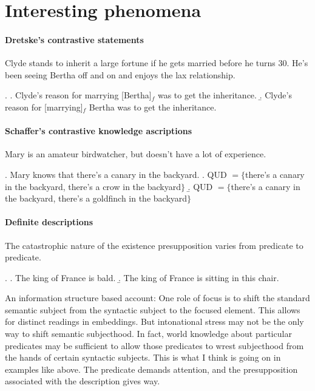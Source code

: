 \documentclass[letterpaper]{article}
\title{}
\author{}
\begin{document}


\section{Interesting phenomena}

\paragraph{Dretske's contrastive statements} Clyde stands to inherit a large fortune if he gets married before he turns 30. He's been seeing Bertha off and on and enjoys the lax relationship.

\ex. \a. Clyde's reason for marrying [Bertha]$_f$ was to get the inheritance.
\b. Clyde's reason for [marrying]$_f$ Bertha was to get the inheritance.

\paragraph{Schaffer's contrastive knowledge ascriptions} Mary is an amateur birdwatcher, but doesn't have a lot of experience.

\ex. Mary knows that there's a canary in the backyard.
\a. QUD $= \{$there's a canary in the backyard, there's a crow in the backyard$\}$
\b. QUD $= \{$there's a canary in the backyard, there's a goldfinch in the backyard$\}$

\paragraph{Definite descriptions} The catastrophic nature of the existence presupposition varies from predicate to predicate.

\ex. \a. The king of France is bald.
\b. The king of France is sitting in this chair.

An information structure based account: One role of focus is to shift the standard semantic subject from the syntactic subject to the focused element. This allows for distinct readings in embeddings.  But intonational stress may not be the only way to shift semantic subjecthood.  In fact, world knowledge about particular predicates may be sufficient to allow those predicates to wrest subjecthood from the hands of certain syntactic subjects.  This is what I think is going on in examples like \Last[b] above.  The predicate demands attention, and the presupposition associated with the description gives way.
\end{document}
